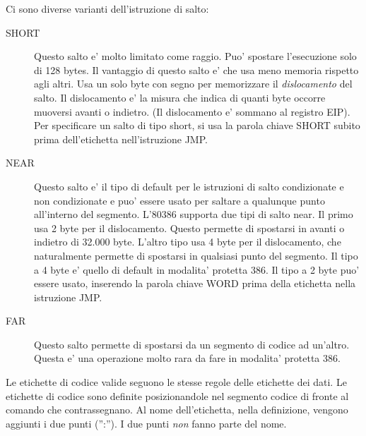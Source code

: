 Ci sono diverse varianti dell'istruzione di salto:
\begin{description}

\item[SHORT] Questo salto e' molto limitato come raggio. Puo' spostare 
l'esecuzione solo di 128 bytes. Il vantaggio di questo salto e' che 
usa meno memoria rispetto agli altri. Usa un solo byte con segno per
memorizzare il \emph{dislocamento} del salto. Il dislocamento e' la misura
che indica di quanti byte occorre muoversi avanti o indietro. (Il
dislocamento e' sommano al registro EIP). Per specificare un salto di tipo
short, si usa la parola chiave {\code SHORT} subito prima dell'etichetta
nell'istruzione {\code JMP}.    

\item[NEAR] Questo salto e' il tipo di default per le istruzioni di 
salto condizionate e non condizionate e puo' essere usato per saltare
a qualunque punto all'interno del segmento. L'80386 supporta due tipi
di salto near. Il primo usa 2 byte per il dislocamento. Questo permette
di spostarsi in avanti o indietro di 32.000 byte. L'altro tipo usa 4
byte per il dislocamento, che naturalmente permette di spostarsi in 
qualsiasi punto del segmento. Il tipo a 4 byte e' quello di default
in modalita' protetta 386. Il tipo a 2 byte puo' essere usato, inserendo
la parola chiave {\code WORD} prima della etichetta nella istruzione
{\code JMP}. 

\item[FAR] Questo salto permette di spostarsi da un segmento di codice 
ad un'altro. Questa e' una operazione molto rara da fare in modalita'
protetta 386.
\end{description}

Le etichette di codice valide seguono le stesse regole delle etichette
dei dati. Le etichette di codice sono definite posizionandole nel
segmento codice di fronte al comando che contrassegnano. Al nome
dell'etichetta, nella definizione,  vengono aggiunti i due punti ('':'').
I due punti \emph{non} fanno parte del nome. 

